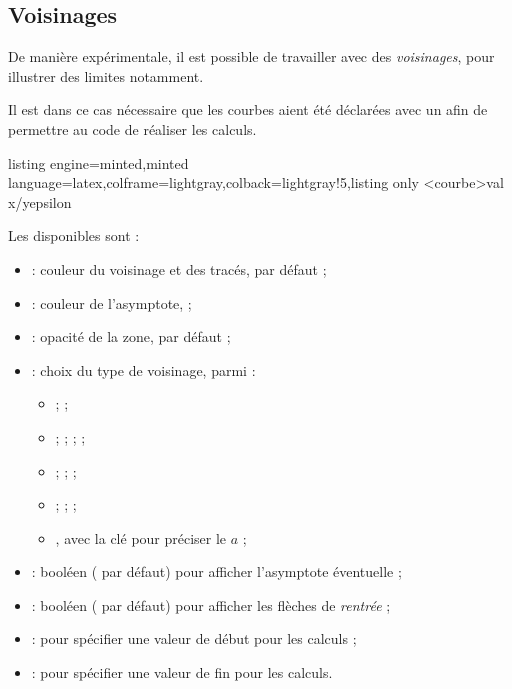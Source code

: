 \documentclass[11pt,a4paper]{ltxdoc}
\begin{document}
\pagebreak

\subsection{Voisinages}\label{voisinages}

De manière expérimentale, il est possible de travailler avec des \textit{voisinages}, pour illustrer des limites notamment.

Il est dans ce cas nécessaire que les courbes aient été déclarées avec un \MontreCode{[Nom=...]} afin de permettre au code de réaliser les calculs.

\begin{tcblisting}{listing engine=minted,minted language=latex,colframe=lightgray,colback=lightgray!5,listing only}
\AfficherVoisinage[clés]<courbe>{val x/y}{epsilon}
\end{tcblisting}

Les  disponibles sont :

\begin{itemize}
  \item {} : couleur du voisinage et des tracés,  par défaut ;
  \item {} : couleur de l'asymptote,  ;
  \item {} : opacité de la zone,  par défaut ;
  \item {} : choix du type de voisinage, parmi :
  \begin{itemize}
    \item {} ;  ;
    \item {} ;  ;  ;  ;
    \item {} ;  ;  ;
    \item {} ;  ;  ;
    \item {}, avec la clé  pour préciser le $a$ ;
  \end{itemize}
  \item {} : booléen ( par défaut) pour afficher l'asymptote éventuelle ;
  \item {} : booléen ( par défaut) pour afficher les flèches de \textit{rentrée} ;
  \item {} : pour spécifier une valeur de début pour les calculs ;
  \item {} : pour spécifier une valeur de fin pour les calculs.
\end{itemize}
\end{document}
